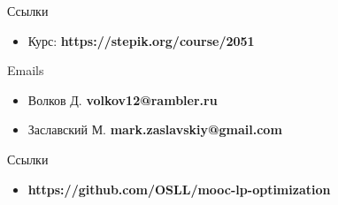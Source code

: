 \documentclass{beamer}
\begin{document}
\begin{frame}{Ссылки}
	\begin{itemize}
		\item Курс: \textbf{https://stepik.org/course/2051}
	\end{itemize}
\end{frame}

\begin{frame}{Emails}
	\begin{itemize}
		\item Волков Д. \textbf{volkov12@rambler.ru}
		\item Заславский М. \textbf{mark.zaslavskiy@gmail.com}
	\end{itemize}
\end{frame}

\begin{frame}{Ссылки}
	\begin{itemize}
		\item \textbf{https://github.com/OSLL/mooc-lp-optimization}
	\end{itemize}
\end{frame}
\end{document}
